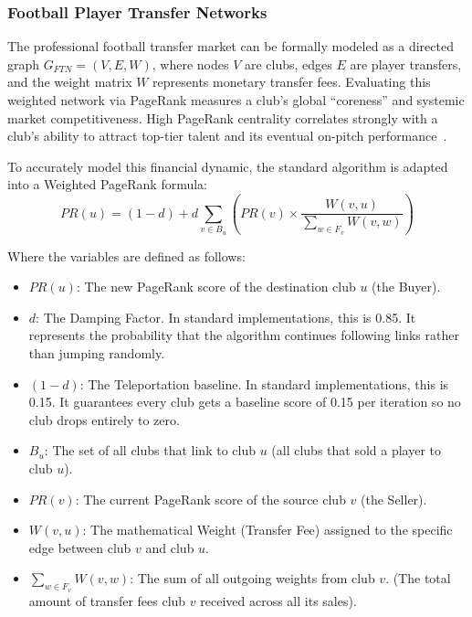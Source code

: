 \subsubsection{Football Player Transfer Networks}

The professional football transfer market can be formally modeled as a directed graph $G_{FTN}=(V,E,W)$, where nodes $V$ are clubs, edges $E$ are player transfers, and the weight matrix $W$ represents monetary transfer fees. Evaluating this weighted network via PageRank measures a club's global ``coreness'' and systemic market competitiveness. High PageRank centrality correlates strongly with a club's ability to attract top-tier talent and its eventual on-pitch performance~\cite{liu2014football, ieice2016football}.

To accurately model this financial dynamic, the standard algorithm is adapted into a Weighted PageRank formula:
\begin{equation}
\label{eq:weighted_pagerank}
PR(u) = (1-d) + d \sum_{v \in B_u} \left( PR(v) \times \frac{W(v,u)}{\displaystyle\sum_{w \in F_v} W(v,w)} \right)
\end{equation}

Where the variables are defined as follows:
\begin{itemize}
    \item $PR(u)$: The new PageRank score of the destination club $u$ (the Buyer).
    \item $d$: The Damping Factor. In standard implementations, this is 0.85. It represents the probability that the algorithm continues following links rather than jumping randomly.
    \item $(1-d)$: The Teleportation baseline. In standard implementations, this is 0.15. It guarantees every club gets a baseline score of 0.15 per iteration so no club drops entirely to zero.
    \item $B_u$: The set of all clubs that link to club $u$ (all clubs that sold a player to club $u$).
    \item $PR(v)$: The current PageRank score of the source club $v$ (the Seller).
    \item $W(v,u)$: The mathematical Weight (Transfer Fee) assigned to the specific edge between club $v$ and club $u$.
    \item $\displaystyle\sum_{w \in F_v} W(v,w)$: The sum of all outgoing weights from club $v$. (The total amount of transfer fees club $v$ received across all its sales).
\end{itemize}


